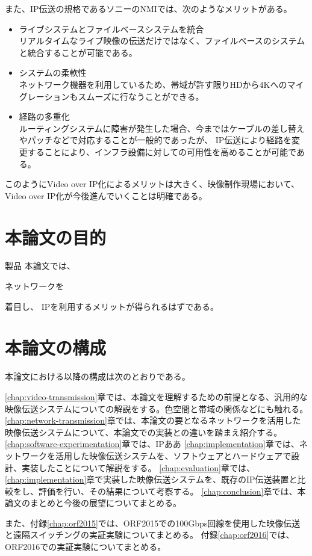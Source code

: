\newpage
また、IP伝送の規格であるソニーのNMI\cite{sony-nmi}では、次のようなメリットがある。

\begin{itemize}
  \item ライブシステムとファイルベースシステムを統合\mbox{}\\
    リアルタイムなライブ映像の伝送だけではなく、ファイルベースのシステムと統合することが可能である。
  \item システムの柔軟性\mbox{}\\
    ネットワーク機器を利用しているため、帯域が許す限りHDから4Kへのマイグレーションもスムーズに行なうことができる。
  \item 経路の多重化\mbox{}\\
    ルーティングシステムに障害が発生した場合、今まではケーブルの差し替えやパッチなどで対応することが一般的であったが、
    IP伝送により経路を変更することにより、インフラ設備に対しての可用性を高めることが可能である。
\end{itemize}

このようにVideo over IP化によるメリットは大きく、映像制作現場において、Video over IP化が今後進んでいくことは明確である。

\section{本論文の目的}
製品
本論文では、

ネットワークを
\cite{ntt-jgn-4k}

着目し、
IPを利用するメリットが得られるはずである。

\section{本論文の構成}
本論文における以降の構成は次のとおりである。

\ref{chap:video-transmission}章では、本論文を理解するための前提となる、汎用的な映像伝送システムについての解説をする。色空間と帯域の関係などにも触れる。
\ref{chap:network-transmission}章では、本論文の要となるネットワークを活用した映像伝送システムについて、本論文での実装との違いを踏まえ紹介する。
\ref{chap:software-experimentation}章では、IPああ
\ref{chap:implementation}章では、ネットワークを活用した映像伝送システムを、ソフトウェアとハードウェアで設計、実装したことについて解説をする。
\ref{chap:evaluation}章では、\ref{chap:implementation}章で実装した映像伝送システムを、既存のIP伝送装置と比較をし、評価を行い、その結果について考察する。
\ref{chap:conclusion}章では、本論文のまとめと今後の展望についてまとめる。

また、付録\ref{chap:orf2015}では、ORF2015での100Gbps回線を使用した映像伝送と遠隔スイッチングの実証実験についてまとめる。
付録\ref{chap:orf2016}では、ORF2016での実証実験についてまとめる。
